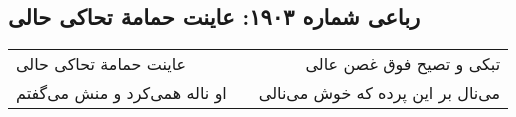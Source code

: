 \begin{center}
\section*{رباعی شماره ۱۹۰۳: عاینت حمامة تحاکی حالی}
\label{sec:1903}
\begin{longtable}{l p{0.5cm} r}
عاینت حمامة تحاکی حالی
&&
تبکی و تصیح فوق غصن عالی
\\
او ناله همی‌کرد و منش می‌گفتم
&&
می‌نال بر این پرده که خوش می‌نالی
\\
\end{longtable}
\end{center}
